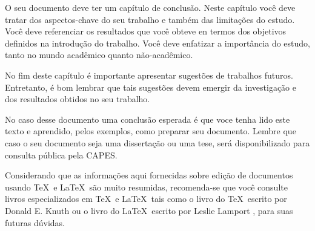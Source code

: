 
O seu documento deve ter um capítulo de conclusão. Neste capítulo você deve tratar dos aspectos-chave do seu trabalho e também das limitações do estudo. Você deve referenciar os resultados que você obteve en termos dos objetivos definidos na introdução do trabalho. Você deve enfatizar a importância do estudo, tanto no mundo acadêmico quanto não-acadêmico. 

No fim deste capítulo é importante apresentar sugestões de trabalhos futuros. Entretanto, é bom lembrar que tais sugestões devem emergir da investigação e dos resultados obtidos no seu trabalho.

No caso desse documento uma conclusão esperada é que voce tenha lido este texto e aprendido, pelos exemplos, como preparar seu documento. Lembre que caso o seu documento seja uma dissertação ou uma tese, será disponibilizado para consulta pública pela CAPES. 

Considerando que as informações aqui fornecidas sobre edição de documentos usando \TeX \ e \LaTeX \ são muito resumidas, recomenda-se que você consulte livros especializados em \TeX \ e \LaTeX \ tais como o livro do \TeX \ escrito por Donald E. Knuth \cite{texbook} ou o livro do \LaTeX \ escrito por Leslie Lamport \cite{latexbook}, para suas futuras dúvidas.
%
%
%
%
